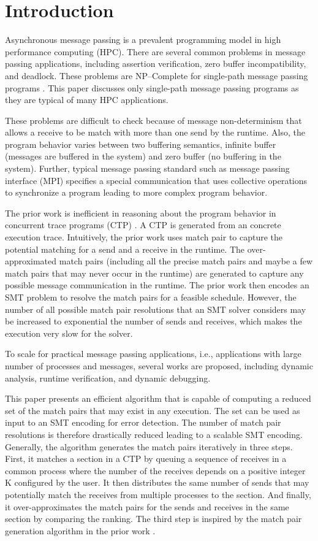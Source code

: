 \section{Introduction}
Asynchronous message passing is a prevalent programming model in high performance computing (HPC). There are several common problems in message passing applications, including assertion verification, zero buffer incompatibility, and deadlock. These problems are NP--Complete for single-path message passing programs \cite{}. This paper discusses only single-path message passing programs as they are typical of many HPC applications. 

These problems are difficult to check because of message non-determinism that allows a receive to be match with more than one send by the runtime. Also, the program behavior varies between two buffering semantics, infinite buffer (messages are buffered in the system) and zero buffer (no buffering in the system). Further, typical message passing standard such as message passing interface (MPI) specifies a special communication that uses collective operations to synchronize a program leading to more complex program behavior. 

The prior work is inefficient in reasoning about the program behavior in concurrent trace programs (CTP) \cite{}. A CTP is generated from an concrete execution trace.  
Intuitively, the prior work uses match pair to capture the potential matching for a send and a receive in the runtime. 
The over-approximated match pairs (including all the precise match pairs and maybe a few match pairs that may never occur in the runtime) are generated to capture any possible message communication in the runtime. 
The prior work then encodes an SMT problem to resolve the match pairs for a feasible schedule. However, the number of all possible match pair resolutions that an SMT solver considers may be increased to exponential the number of sends and receives, which makes the execution very slow for the solver.  


To scale for practical message passing applications, i.e., applications with large number of processes and messages, several works are proposed, including dynamic analysis, runtime verification, and dynamic debugging.

This paper presents an efficient algorithm that is capable of computing a reduced set of the match pairs that may exist in any execution. The set can be used as input to an SMT encoding for error detection. The number of match pair resolutions is therefore drastically reduced leading to a scalable SMT encoding. Generally, the algorithm generates the match pairs iteratively in three steps. First, it matches a section in a CTP by queuing a sequence of receives in a common process where the number of the receives depends on a positive integer K configured by the user. It then distributes the same number of sends that may potentially match the receives from multiple processes to the section. And finally, it over-approximates the match pairs for the sends and receives in the same section by comparing the ranking. The third step is inspired by the match pair generation algorithm in the prior work \cite{}. 

